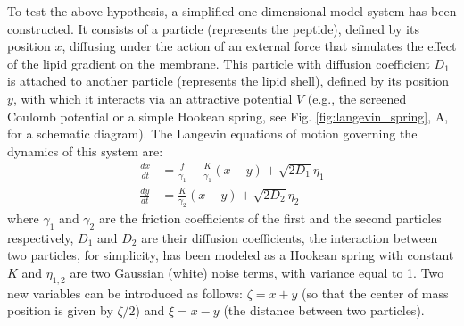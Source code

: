 To test the above hypothesis, a simplified one-dimensional model system has been constructed. It consists of a particle (represents the peptide), defined by its position $x$, diffusing under the action of an external force that simulates the effect of the lipid gradient on the membrane. This particle with diffusion coefficient $D_1$ is attached to another particle (represents the lipid shell), defined by its position $y$, with which it interacts via an attractive potential $V$ (e.g., the screened Coulomb potential or a simple Hookean spring, see Fig. \ref{fig:langevin_spring}, A, for a schematic diagram). The Langevin equations of motion governing the dynamics of this system are:
\begin{align}
\label{Langevin_equations}
 \frac{dx}{dt} &= \frac{f}{\gamma_1} - \frac{K}{\gamma_1}(x-y) + \sqrt{2D_1}\eta_1 \nonumber \\
 \frac{dy}{dt} &= \frac{K}{\gamma_2}(x-y) + \sqrt{2D_2}\eta_2
\end{align}
where $\gamma_1$ and $\gamma_2$ are the friction coefficients of the first and the second particles respectively, $D_1$ and $D_2$ are their diffusion coefficients, the interaction between two particles, for simplicity, has been modeled as a Hookean spring with constant $K$ and $\eta_{1,2}$ are two Gaussian (white) noise terms, with variance equal to 1. Two new variables can be introduced as follows: $\zeta = x+y$ (so that the center of mass position is given by $\zeta/2$) and $\xi=x-y$ (the distance between two particles).
